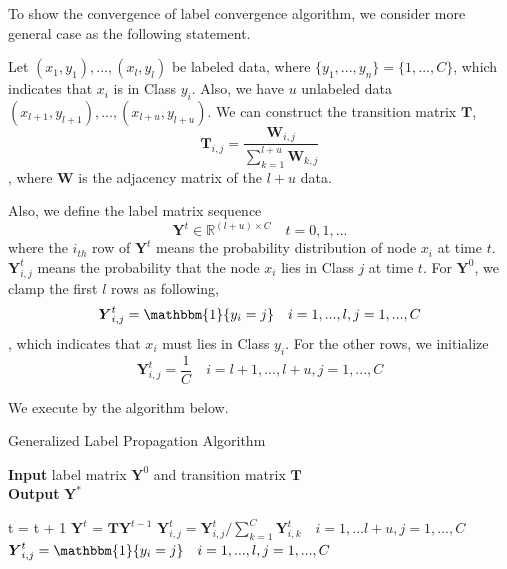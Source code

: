 \documentclass{article}
\begin{document}
To show the convergence of label convergence algorithm, we consider more general case as the following statement.

Let $(x_1, y_1),...,(x_l,y_l)$ be labeled data, where $\{y_1, ..., y_n\}=\{1,...,C\}$, which indicates that $x_i$ is in Class $y_i$. Also, we have $u$ unlabeled data  $(x_{l+1}, y_{l+1}),...,(x_{l+u},y_{l+u})$. We can construct the transition matrix $\boldsymbol{T}$,
$$\boldsymbol{T}_{i,j} = \frac{\boldsymbol{W}_{i,j}}{\sum_{k=1}^{l+u} \boldsymbol{W}_{k,j}}$$,
where $\boldsymbol{W}$ is the adjacency matrix of the $l+u$ data.

Also, we define the label matrix sequence $$\boldsymbol{Y}^t \in \mathbb{R}^{(l+u) \times C} \quad t=0,1,...$$ where the $i_{th}$ row of $\boldsymbol{Y}^t$ means the probability distribution of node $x_i$ at time $t$. $\boldsymbol{Y}^t_{i,j}$ means the probability that the node $x_i$ lies in Class $j$ at time $t$. For $\boldsymbol{Y}^0$, we clamp the first $l$ rows as following,
$$\boldsymbol{Y}^{t}_{i,j}= \mathbbm{1}\{y_i=j\} \quad i = 1,...,l, j = 1,...,C$$,
which indicates that $x_i$ must lies in Class $y_i$. For the other rows, we initialize
$$\boldsymbol{Y}^{t}_{i,j}= \frac{1}{C} \quad i = l+1,...,l+u, j = 1,...,C$$

We execute by the algorithm below.

\begin{algorithm}
  \caption{Generalized Label Propagation Algorithm}
  \label{alg:generalized_label_propagation_algorithm}
  \hspace*{\algorithmicindent} \textbf{Input}  label matrix $\boldsymbol{Y}^0$ and transition matrix $\boldsymbol{T}$ \\
  \hspace*{\algorithmicindent} \textbf{Output} $\boldsymbol{Y}^*$
  \begin{algorithmic}[1]
    \Repeat
        \State t = t + 1
        \State $\boldsymbol{Y}^{t}$ = $\boldsymbol{T} \boldsymbol{Y}^{t-1}$ 
        \State $\boldsymbol{Y}^{t}_{i,j} = \boldsymbol{Y}^{t}_{i,j} / \sum_{k=1}^{C} \boldsymbol{Y}^{t}_{i,k} \quad i=1,...l+u ,j=1,...,C$ 
        \State $\boldsymbol{Y}^{t}_{i,j}= \mathbbm{1}\{y_i=j\} \quad i = 1,...,l, j = 1,...,C$ 
    \EndProcedure
   \end{algorithmic}
\end{algorithm}
\end{document}
